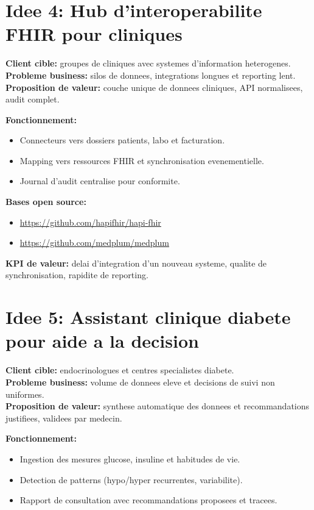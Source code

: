 \documentclass[11pt,a4paper]{article}
\begin{document}
\section*{Idee 4: Hub d'interoperabilite FHIR pour cliniques}
\textbf{Client cible:} groupes de cliniques avec systemes d'information heterogenes.\\
\textbf{Probleme business:} silos de donnees, integrations longues et reporting lent.\\
\textbf{Proposition de valeur:} couche unique de donnees cliniques, API normalisees, audit complet.

\textbf{Fonctionnement:}
\begin{itemize}[leftmargin=*]
  \item Connecteurs vers dossiers patients, labo et facturation.
  \item Mapping vers ressources FHIR et synchronisation evenementielle.
  \item Journal d'audit centralise pour conformite.
\end{itemize}

\textbf{Bases open source:}
\begin{itemize}[leftmargin=*]
  \item \url{https://github.com/hapifhir/hapi-fhir}
  \item \url{https://github.com/medplum/medplum}
\end{itemize}

\textbf{KPI de valeur:} delai d'integration d'un nouveau systeme, qualite de synchronisation, rapidite de reporting.

\section*{Idee 5: Assistant clinique diabete pour aide a la decision}
\textbf{Client cible:} endocrinologues et centres specialistes diabete.\\
\textbf{Probleme business:} volume de donnees eleve et decisions de suivi non uniformes.\\
\textbf{Proposition de valeur:} synthese automatique des donnees et recommandations justifiees, validees par medecin.

\textbf{Fonctionnement:}
\begin{itemize}[leftmargin=*]
  \item Ingestion des mesures glucose, insuline et habitudes de vie.
  \item Detection de patterns (hypo/hyper recurrentes, variabilite).
  \item Rapport de consultation avec recommandations proposees et tracees.
\end{itemize}
\end{document}
